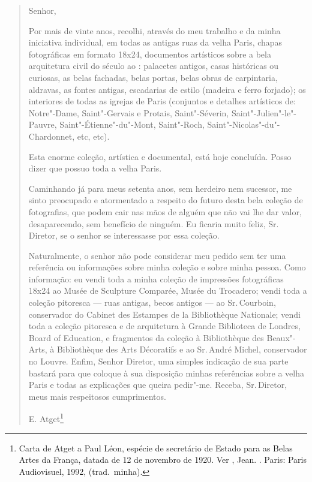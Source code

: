 \begin{quote}
Senhor,

Por mais de vinte anos, recolhi, através do meu trabalho e da minha
iniciativa individual, em todas as antigas ruas da velha Paris, chapas
fotográficas em formato 18x24, documentos artísticos sobre a bela
arquitetura civil do século  ao : palacetes antigos, casas
históricas ou curiosas, as belas fachadas, belas portas, belas obras de
carpintaria, aldravas, as fontes antigas, escadarias de estilo (madeira
e ferro forjado); os interiores de todas as igrejas de Paris (conjuntos
e detalhes artísticos de: Notre"-Dame, Saint"-Gervais e Protais,
Saint"-Séverin, Saint"-Julien"-le"-Pauvre, Saint"-Étienne"-du"-Mont,
Saint"-Roch, Saint"-Nicolas"-du"-Chardonnet, etc, etc).

Esta enorme coleção, artística e documental, está hoje concluída. Posso
dizer que possuo toda a velha Paris.

Caminhando já para meus setenta anos, sem herdeiro nem sucessor, me
sinto preocupado e atormentado a respeito do futuro desta bela coleção
de fotografias, que podem cair nas mãos de alguém que não vai lhe dar
valor, desaparecendo, sem benefício de ninguém. Eu ficaria muito feliz,
Sr.\,Diretor, se o senhor se interessasse por essa coleção.

Naturalmente, o senhor não pode considerar meu pedido sem ter uma
referência ou informações sobre minha coleção e sobre minha pessoa. Como
informação: eu vendi toda a minha coleção de impressões fotográficas 18x24 ao Musée de Sculpture Comparée, Musée du Trocadero; vendi toda a
coleção pitoresca --- ruas antigas, becos antigos --- ao Sr.\,Courboin,
conservador do Cabinet des Estampes de la Bibliothèque Nationale; vendi
toda a coleção pitoresca e de arquitetura à Grande Biblioteca de
Londres, Board of Education, e fragmentos da coleção à Bibliothèque des
Beaux"-Arts, à Bibliothèque des Arts Décoratifs e ao Sr.\,André Michel,
conservador no Louvre. Enfim, Senhor Diretor, uma simples indicação de
sua parte bastará para que coloque à sua disposição minhas referências
sobre a velha Paris e todas as explicações que queira pedir"-me. Receba,
Sr.\,Diretor, meus mais respeitosos cumprimentos.

\hfill{}E. Atget\footnote{Carta de Atget a Paul Léon, espécie de secretário de
  Estado para as Belas Artes da França, datada de 12 de novembro de
  1920. Ver , Jean. {}. Paris: Paris Audiovisuel, 1992, (trad.~minha).}
\end{quote}

